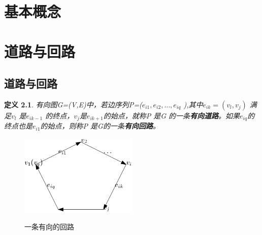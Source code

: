 \documentclass[11pt,a4paper,openany]{book}
\newtheorem{defination}{\textbf{定义}}[section]
\begin{document}
\pagestyle{plain}  %
\chapter{基本概念}
\chapter{道路与回路}
\section{道路与回路}
\begin{defination}\K 有向图G=(V,E)中，若边序列P=($e_{i1},e_{i2},\dots,e_{iq}$ ),其中$e_{ik}=(v_l,v_j )$ 满足$v_l$ 是$e_{ik-1}$ 的终点，$v_j$是$e_{ik+1}$的始点，就称P 是G 的一条\textbf{有向道路}。如果$e_{iq}$的终点也是$e_{i1}$的始点，则称P 是G的一条\textbf{有向回路}。
\end{defination}
\begin{figure}[H]
  \centering
  \includegraphics[width=0.5\textwidth]{2.1.1.png}\\
  \caption*{一条有向的回路}
\end{figure}
\end{document}
